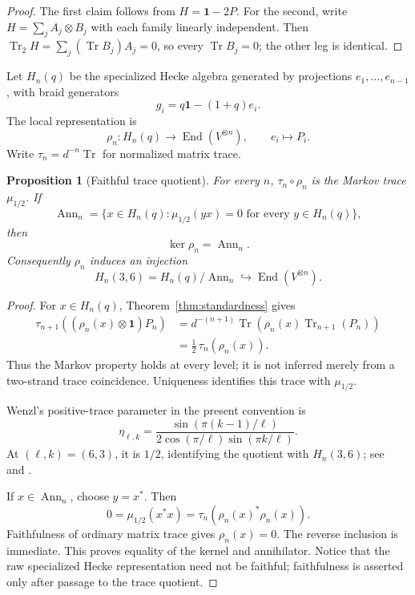 \documentclass[11pt]{article}
\newtheorem{proposition}[theorem]{Proposition}
\theoremstyle{definition}
\theoremstyle{remark}
\newcommand{\Id}{\mathbf 1}
\newcommand{\Tr}{\operatorname{Tr}}
\newcommand{\End}{\operatorname{End}}
\newcommand{\Ann}{\operatorname{Ann}}
\begin{document}
\begin{proof}
The first claim follows from \(H=\Id-2P\). For the second, write
\(H=\sum_jA_j\otimes B_j\) with each family linearly independent.
Then
\(\Tr_2H=\sum_j(\Tr B_j)A_j=0\), so every \(\Tr B_j=0\); the other
leg is identical.
\end{proof}

Let \(H_n(q)\) be the specialized Hecke algebra generated by projections
\(e_1,\ldots,e_{n-1}\), with braid generators
\[
  g_i=q\Id-(1+q)e_i.
\]
The local representation is
\[
  \rho_n:H_n(q)\longrightarrow\End(V^{\otimes n}),
  \qquad e_i\longmapsto P_i.
\]
Write \(\tau_n=d^{-n}\Tr\) for normalized matrix trace.

\begin{proposition}[Faithful trace quotient]\label{prop:trace-quotient}
For every \(n\), \(\tau_n\circ\rho_n\) is the Markov trace
\(\mu_{1/2}\). If
\[
  \Ann_n
  =\{x\in H_n(q):\mu_{1/2}(yx)=0
      \text{ for every }y\in H_n(q)\},
\]
then
\[
  \ker\rho_n=\Ann_n.
\]
Consequently \(\rho_n\) induces an injection
\[
  H_n(3,6)=H_n(q)/\Ann_n
  \hookrightarrow\End(V^{\otimes n}).
\]
\end{proposition}

\begin{proof}
For \(x\in H_n(q)\), Theorem~\ref{thm:standardness} gives
\[
\begin{aligned}
 \tau_{n+1}\!\left((\rho_n(x)\otimes\Id)P_n\right)
 &=d^{-(n+1)}
   \Tr\!\left(\rho_n(x)\Tr_{n+1}(P_n)\right)\\
 &=\frac12\,\tau_n(\rho_n(x)).
\end{aligned}
\]
Thus the Markov property holds at every level; it is not inferred merely
from a two-strand trace coincidence. Uniqueness identifies this trace with
\(\mu_{1/2}\).

Wenzl's positive-trace parameter in the present convention is
\[
  \eta_{\ell,k}
  =
  \frac{\sin(\pi(k-1)/\ell)}
       {2\cos(\pi/\ell)\sin(\pi k/\ell)}.
\]
At \((\ell,k)=(6,3)\), it is \(1/2\), identifying the quotient with
\(H_n(3,6)\); see~\cite[Theorem 3.3]{Lechner2026} and
\cite{Wenzl1988}.

If \(x\in\Ann_n\), choose \(y=x^*\). Then
\[
  0=\mu_{1/2}(x^*x)
  =\tau_n(\rho_n(x)^*\rho_n(x)).
\]
Faithfulness of ordinary matrix trace gives \(\rho_n(x)=0\). The reverse
inclusion is immediate. This proves equality of the kernel and
annihilator. Notice that the raw specialized Hecke representation need
not be faithful; faithfulness is asserted only after passage to the trace
quotient.
\end{proof}
\end{document}
